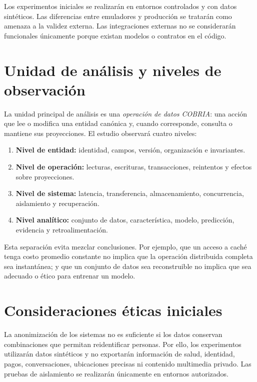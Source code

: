 Los experimentos iniciales se realizarán en entornos controlados y con datos sintéticos.
Las diferencias entre emuladores y producción se tratarán como amenaza a la validez
externa. Las integraciones externas no se considerarán funcionales únicamente porque
existan modelos o contratos en el código.

\section{Unidad de análisis y niveles de observación}

La unidad principal de análisis es una \emph{operación de datos COBRIA}: una acción que
lee o modifica una entidad canónica y, cuando corresponde, consulta o mantiene sus
proyecciones. El estudio observará cuatro niveles:

\begin{enumerate}[leftmargin=*]
  \item \textbf{Nivel de entidad:} identidad, campos, versión, organización e invariantes.
  \item \textbf{Nivel de operación:} lecturas, escrituras, transacciones, reintentos y
  efectos sobre proyecciones.
  \item \textbf{Nivel de sistema:} latencia, transferencia, almacenamiento,
  concurrencia, aislamiento y recuperación.
  \item \textbf{Nivel analítico:} conjunto de datos, característica, modelo, predicción, evidencia
  y retroalimentación.
\end{enumerate}

Esta separación evita mezclar conclusiones. Por ejemplo, que un acceso a caché tenga
costo promedio constante no implica que la operación distribuida completa sea
instantánea; y que un conjunto de datos sea reconstruible no implica que sea adecuado o ético
para entrenar un modelo.

\section{Consideraciones éticas iniciales}

La anonimización de los sistemas no es suficiente si los datos conservan combinaciones
que permitan reidentificar personas. Por ello, los experimentos utilizarán datos
sintéticos y no exportarán información de salud, identidad, pagos, conversaciones,
ubicaciones precisas ni contenido multimedia privado. Las pruebas de aislamiento se
realizarán únicamente en entornos autorizados.

